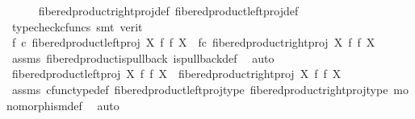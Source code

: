 \begin{isabellebody}
\ \ \ \ \isamarkupfalse%
\ fibered{\isacharunderscore}{\kern0pt}product{\isacharunderscore}{\kern0pt}right{\isacharunderscore}{\kern0pt}proj{\isacharunderscore}{\kern0pt}def\ fibered{\isacharunderscore}{\kern0pt}product{\isacharunderscore}{\kern0pt}left{\isacharunderscore}{\kern0pt}proj{\isacharunderscore}{\kern0pt}def\isanewline
\ \ \ \ \isamarkupfalse%
\ {\isacharparenleft}{\kern0pt}typecheck{\isacharunderscore}{\kern0pt}cfuncs{\isacharcomma}{\kern0pt}\ smt\ {\isacharparenleft}{\kern0pt}verit{\isacharparenright}{\kern0pt}{\isacharparenright}{\kern0pt}\isanewline
\ \ \isamarkupfalse%
\ \isamarkupfalse%
\ {\isachardoublequoteopen}f\ {\isasymcirc}\isactrlsub c\ {\isacharparenleft}{\kern0pt}fibered{\isacharunderscore}{\kern0pt}product{\isacharunderscore}{\kern0pt}left{\isacharunderscore}{\kern0pt}proj\ X\ f\ f\ X{\isacharparenright}{\kern0pt}\ {\isacharequal}{\kern0pt}\ f{\isasymcirc}\isactrlsub c\ {\isacharparenleft}{\kern0pt}fibered{\isacharunderscore}{\kern0pt}product{\isacharunderscore}{\kern0pt}right{\isacharunderscore}{\kern0pt}proj\ X\ f\ f\ X{\isacharparenright}{\kern0pt}{\isachardoublequoteclose}\isanewline
\ \ \ \ \isamarkupfalse%
\ assms\ fibered{\isacharunderscore}{\kern0pt}product{\isacharunderscore}{\kern0pt}is{\isacharunderscore}{\kern0pt}pullback\ is{\isacharunderscore}{\kern0pt}pullback{\isacharunderscore}{\kern0pt}def\ \isamarkupfalse%
\ auto\isanewline
\ \ \isamarkupfalse%
\ \isamarkupfalse%
\ {\isachardoublequoteopen}{\isacharparenleft}{\kern0pt}fibered{\isacharunderscore}{\kern0pt}product{\isacharunderscore}{\kern0pt}left{\isacharunderscore}{\kern0pt}proj\ X\ f\ f\ X{\isacharparenright}{\kern0pt}\ {\isacharequal}{\kern0pt}\ {\isacharparenleft}{\kern0pt}fibered{\isacharunderscore}{\kern0pt}product{\isacharunderscore}{\kern0pt}right{\isacharunderscore}{\kern0pt}proj\ X\ f\ f\ X{\isacharparenright}{\kern0pt}{\isachardoublequoteclose}\isanewline
\ \ \ \ \isamarkupfalse%
\ assms\ cfunc{\isacharunderscore}{\kern0pt}type{\isacharunderscore}{\kern0pt}def\ fibered{\isacharunderscore}{\kern0pt}product{\isacharunderscore}{\kern0pt}left{\isacharunderscore}{\kern0pt}proj{\isacharunderscore}{\kern0pt}type\ fibered{\isacharunderscore}{\kern0pt}product{\isacharunderscore}{\kern0pt}right{\isacharunderscore}{\kern0pt}proj{\isacharunderscore}{\kern0pt}type\ monomorphism{\isacharunderscore}{\kern0pt}def\ \isamarkupfalse%
\ auto\isanewline
{}\isamarkupfalse%
\isanewline
\ \ \isamarkupfalse%

\end{isabellebody}
